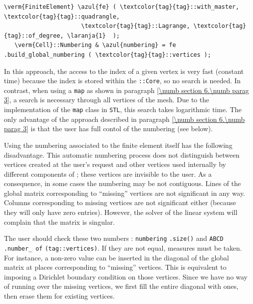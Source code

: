 \begin{Verbatim}[commandchars=\\\{\},formatcom=\small\tt,frame=single,
   label=parag-\ref{\numb section 6.\numb parag 5}.cpp,rulecolor=\color{moldura},
   baselinestretch=0.94,framesep=2mm                                            ]
   \verm{FiniteElement} \azul{fe} ( \textcolor{tag}{tag}::with_master, \textcolor{tag}{tag}::quadrangle,
                      \textcolor{tag}{tag}::Lagrange, \textcolor{tag}{tag}::of_degree, \laranja{1}  );
   \verm{Cell}::Numbering & \azul{numbering} = fe .build_global_numbering ( \textcolor{tag}{tag}::vertices );
\end{Verbatim}

In this approach, the access to the index of a given vertex is very fast (constant time)
because the index is stored within the {\small\tt{}::Core}, so no search is needed.
In contrast, when using a {\small\tt map} as shown in paragraph
\ref{\numb section 6.\numb parag 3}, a search is necessary through all vertices of the mesh.
Due to the implementation of the {\small\tt map} class in {\tt STL}, this search takes
logarithmic time.
The only advantage of the approach described in paragraph \ref{\numb section 6.\numb parag 3}
is that the user has full contol of the numbering (see below).

Using the numbering associated to the finite element itself has the following disadvantage.
This automatic numbering process does not distinguish between vertices created at the user's
request and other vertices used internally by different components of {\maniFEM};
these vertices are invisible to the user.
As a consequence, in some cases the numbering may be not contiguous.
Lines of the global matrix corresponding to ``missing'' vertices are not significant in any way.
Columns corresponding to missing vertices are not significant either (because they will only
have zero entries).
However, the solver of the linear system will complain that the matrix is singular.

The user should check these two numbers : {\small\tt numbering} {\small\tt.size()} and
{\small\tt ABCD}  {\small\tt .number\_\,of}  {\small\tt (\textcolor{tag}{tag}::vertices)}.
If they are not equal, measures must be taken.
For instance, a non-zero value can be inserted in the diagonal of the global matrix
at places corresponding to ``missing'' vertices.
This is equivalent to imposing a Dirichlet boundary condition on those vertices.
Since we have no way of running over the missing vertices, we first fill the entire
diagonal with ones, then erase them for existing vertices.

